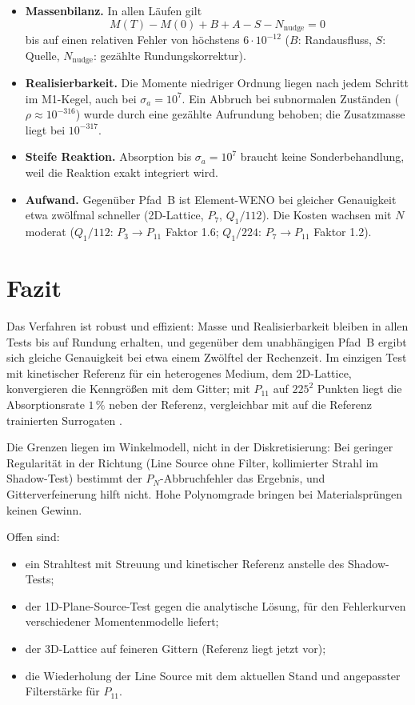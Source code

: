 \begin{itemize}
  \item \textbf{Massenbilanz.} In allen Läufen gilt
        \[
          M(T)-M(0)+B+A-S-N_{\mathrm{nudge}}=0
        \]
        bis auf einen relativen Fehler von höchstens $6\cdot10^{-12}$ ($B$: Randausfluss,
        $S$: Quelle, $N_{\mathrm{nudge}}$: gezählte Rundungskorrektur).
  \item \textbf{Realisierbarkeit.} Die Momente niedriger Ordnung liegen nach jedem Schritt im
        M1-Kegel, auch bei $\sigma_a=10^7$. Ein Abbruch bei subnormalen Zuständen
        ($\rho\approx10^{-316}$) wurde durch eine gezählte Aufrundung behoben; die Zusatzmasse liegt
        bei $10^{-317}$.
  \item \textbf{Steife Reaktion.} Absorption bis $\sigma_a=10^7$ braucht keine Sonderbehandlung, weil
        die Reaktion exakt integriert wird.
  \item \textbf{Aufwand.} Gegenüber Pfad~B ist Element-WENO bei gleicher Genauigkeit etwa zwölfmal
        schneller (2D-Lattice, $P_7$, $Q_1/112$). Die Kosten wachsen mit $N$ moderat
        ($Q_1/112$: $P_3\to P_{11}$ Faktor 1.6; $Q_1/224$: $P_7\to P_{11}$ Faktor 1.2).
\end{itemize}

\section{Fazit}
\label{sec:tests:fazit}

Das Verfahren ist robust und effizient: Masse und Realisierbarkeit bleiben in allen Tests bis auf
Rundung erhalten, und gegenüber dem unabhängigen Pfad~B ergibt sich gleiche Genauigkeit bei etwa
einem Zwölftel der Rechenzeit. Im einzigen Test mit kinetischer Referenz für ein heterogenes Medium,
dem 2D-Lattice, konvergieren die Kenngrößen mit dem Gitter; mit $P_{11}$ auf $225^2$ Punkten liegt die
Absorptionsrate $1\,\%$ neben der Referenz, vergleichbar mit auf die Referenz trainierten Surrogaten
\cite{gonzales_2026}.

Die Grenzen liegen im Winkelmodell, nicht in der Diskretisierung: Bei geringer Regularität in der
Richtung (Line Source ohne Filter, kollimierter Strahl im Shadow-Test) bestimmt der
$P_N$-Abbruchfehler das Ergebnis, und Gitterverfeinerung hilft nicht. Hohe Polynomgrade bringen bei
Materialsprüngen keinen Gewinn.

Offen sind:
\begin{itemize}
  \item ein Strahltest mit Streuung und kinetischer Referenz anstelle des Shadow-Tests;
  \item der 1D-Plane-Source-Test gegen die analytische Lösung, für den
        \cite{schneider_leibner_2022} Fehlerkurven verschiedener Momentenmodelle liefert;
  \item der 3D-Lattice auf feineren Gittern (Referenz liegt jetzt vor);
  \item die Wiederholung der Line Source mit dem aktuellen Stand und angepasster Filterstärke für
        $P_{11}$.
\end{itemize}
